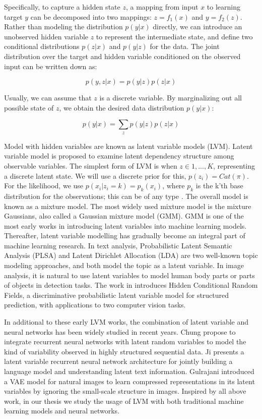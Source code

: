 Specifically, to capture a hidden state $z$, a mapping from input $x$ to learning target $y$ can be decomposed into two mappings: $z=f_1(x)$ and $y=f_2(z)$. Rather than modeling the distribution $p(y|x)$ directly, we can introduce an unobserved hidden variable $z$ to represent the intermediate state, and define two conditional distributions $p(z|x)$ and $p(y|z)$ for the data. The joint distribution over the target and hidden variable conditioned on the observed input can be written down as:

\[p(y,z|x) = p(y|z)p(z|x)\]

Usually, we can assume that $z$ is a discrete variable. By marginalizing out all possible state of $z$, we obtain the desired data distribution $p(y|x)$:

\[p(y|x) = \sum_z p(y|z)p(z|x)\] \label{eq2}

Model with hidden variables are known as latent variable models (LVM). Latent variable model is proposed to examine latent dependency structure among observable variables. The simplest form of LVM is when $z\in{1,...,K}$, representing a discrete latent state. We will use a discrete prior for this, $p(z_i)=Cat(\pi)$. For the likelihood, we use $p(x_i|z_i=k)=p_k(x_i)$, where $p_k$ is the k'th base distribution for the observations; this can be of any type \cite{murphy2012machine}. The overall model is known as a mixture model. The most widely used mixture model is the mixture Gaussians, also called a Gaussian mixture model (GMM). GMM is one of the most early works in introducing latent variables into machine learning models. Thereafter, latent variable modelling has gradually become an integral part of machine learning research. In text analysis, Probabilistic Latent Semantic Analysis (PLSA) \cite{hofmann2013probabilistic2} and Latent Dirichlet Allocation (LDA) \cite{blei2003latent} are two well-known topic modeling approaches, and both model the topic as a latent variable. In image analysis, it is natural to use latent variables to model human body parts or parts of objects in detection tasks. The work in \cite{wang2006hidden} introduces Hidden Conditional Random Fields, a discriminative probabilistic latent variable model for structured prediction, with applications to two computer vision tasks. 

In additional to these early LVM works, the combination of latent variable and neural networks has been widely studied in recent years. Chung \cite{chung2015recurrent} propose to integrate recurrent neural networks with latent random variables to model the kind of variability observed in highly structured sequential data. Ji \cite{ji2016latent2} presents a latent variable recurrent neural network architecture for jointly building a language model and understanding latent text information. Gulrajani \cite{gulrajani2016pixelvae2} introduced a VAE model for natural images to learn compressed representations in its latent variables by ignoring the small-scale structure in images. Inspired by all above work, in our thesis we study the usage of LVM with both traditional machine learning models and neural networks.

